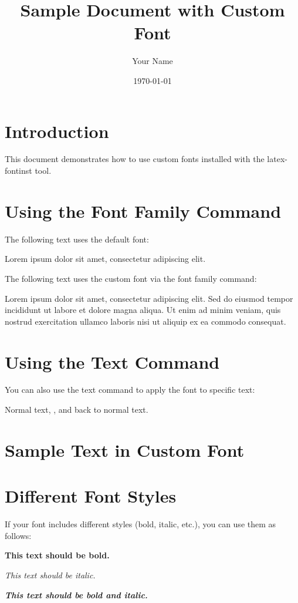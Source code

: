 \documentclass{article}
\title{Sample Document with Custom Font}
\author{Your Name}
\date{\today}
\begin{document}
\maketitle

\section{Introduction}

This document demonstrates how to use custom fonts installed with the latex-fontinst tool.

\section{Using the Font Family Command}

The following text uses the default font:

Lorem ipsum dolor sit amet, consectetur adipiscing elit.

\bigskip

The following text uses the custom font via the font family command:

{\CronosPro
Lorem ipsum dolor sit amet, consectetur adipiscing elit. Sed do eiusmod tempor 
incididunt ut labore et dolore magna aliqua. Ut enim ad minim veniam, quis nostrud 
exercitation ullamco laboris nisi ut aliquip ex ea commodo consequat.
}

\section{Using the Text Command}

You can also use the text command to apply the font to specific text:

Normal text, , and back to normal text.

\section{Sample Text in Custom Font}

{\fontname
\lipsum[1-2]
}

\section{Different Font Styles}

If your font includes different styles (bold, italic, etc.), you can use them as follows:

{\fontname
\textbf{This text should be bold.}

\textit{This text should be italic.}

\textbf{\textit{This text should be bold and italic.}}
}
\end{document}
